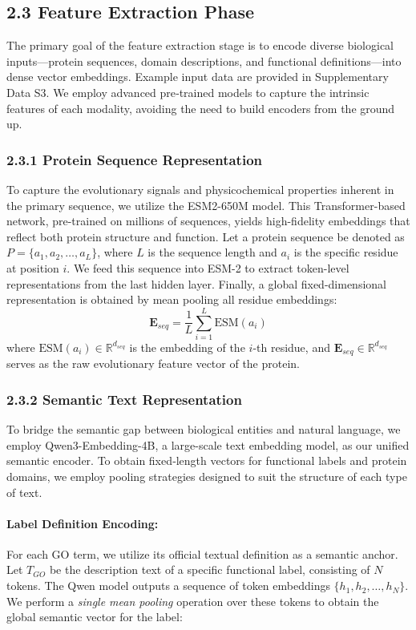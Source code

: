 \documentclass[unnumsec,webpdf,contemporary,large]{oup-authoring-template}%
\theoremstyle{thmstyleone}%
\theoremstyle{thmstyletwo}%
\theoremstyle{thmstylethree}%
\begin{document}
\subsection{2.3 Feature Extraction Phase}
The primary goal of the feature extraction stage is to encode diverse biological inputs—protein sequences, domain descriptions, and functional definitions—into dense vector embeddings. Example input data are provided in Supplementary Data S3. We employ advanced pre‑trained models to capture the intrinsic features of each modality, avoiding the need to build encoders from the ground up.

\subsubsection{2.3.1 Protein Sequence Representation}
To capture the evolutionary signals and physicochemical properties inherent in the primary sequence, we utilize the ESM2-650M model. This Transformer-based\citep{vaswani2017attention} network, pre-trained on millions of sequences, yields high-fidelity embeddings that reflect both protein structure and function. Let a protein sequence be denoted as $P = \{a_1, a_2, \dots, a_L\}$, where $L$ is the sequence length and $a_i$ is the specific residue at position $i$. We feed this sequence into ESM-2 to extract token-level representations from the last hidden layer. Finally, a global fixed-dimensional representation is obtained by mean pooling all residue embeddings:
\begin{equation}
    \mathbf{E}_{seq} = \frac{1}{L} \sum_{i=1}^{L} \text{ESM}(a_i)
\end{equation}
where $\text{ESM}(a_i) \in \mathbb{R}^{d_{seq}}$ is the embedding of the $i$-th residue, and $\mathbf{E}_{seq} \in \mathbb{R}^{d_{seq}}$ serves as the raw evolutionary feature vector of the protein.

\subsubsection{2.3.2 Semantic Text Representation}
To bridge the semantic gap between biological entities and natural language, we employ Qwen3-Embedding-4B, a large-scale text embedding model, as our unified semantic encoder. To obtain fixed‑length vectors for functional labels and protein domains, we employ pooling strategies designed to suit the structure of each type of text.

\paragraph{Label Definition Encoding:}
For each GO term, we utilize its official textual definition as a semantic anchor. Let $T_{GO}$ be the description text of a specific functional label, consisting of $N$ tokens. The Qwen model outputs a sequence of token embeddings $\{h_1, h_2, \dots, h_N\}$. We perform a \textit{single mean pooling} operation over these tokens to obtain the global semantic vector for the label:
\end{document}
